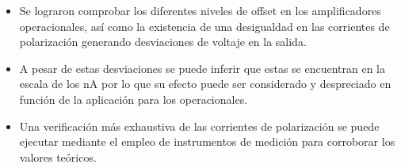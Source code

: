 \begin{itemize}
	\item Se lograron comprobar los diferentes niveles de offset en los amplificadores operacionales, así como la existencia de una desigualdad en las corrientes de polarización generando desviaciones de voltaje en la salida.
	\item A pesar de estas desviaciones se puede inferir que estas se encuentran en la escala de los nA por lo que su efecto puede ser considerado y despreciado en función de la aplicación para los operacionales.
	\item Una verificación más exhaustiva de las corrientes de polarización se puede ejecutar mediante el empleo de instrumentos de medición para corroborar los valores teóricos.
\end{itemize}

























